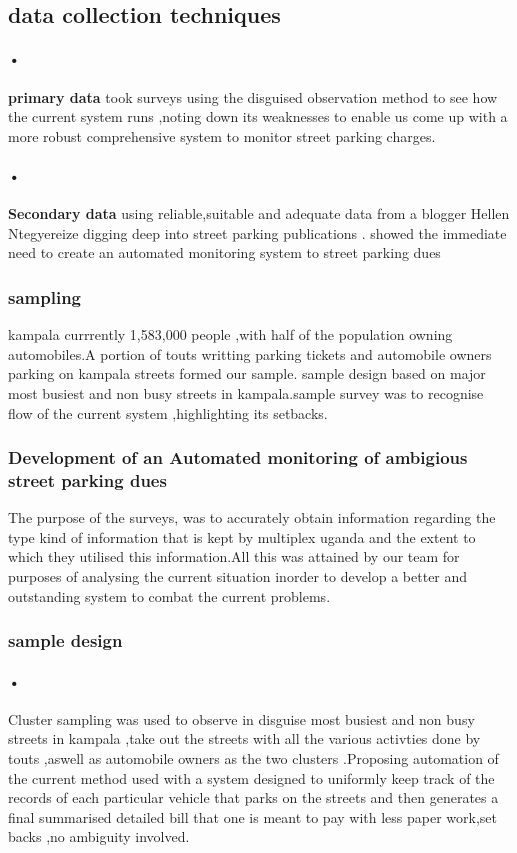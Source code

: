 \documentclass[12pt]{article}
\begin{document}
 \subsection{ data collection techniques }
\paragraph{•}\textbf{ primary data} took surveys using the disguised observation method to see how the current system runs ,noting down its weaknesses to enable us come up with a more robust comprehensive system to monitor street parking charges.\\
   
 \paragraph{•}\textbf{ Secondary data} using reliable,suitable and adequate data from a blogger Hellen Ntegyereize  digging deep into street parking publications . showed the immediate need to create an automated monitoring system to street parking dues\\
\subsubsection{ sampling }
 kampala currrently 1,583,000 people ,with half of the population owning automobiles.A portion of touts writting parking tickets  and automobile owners  parking on kampala streets formed our sample. sample design based on major most busiest and non busy streets in kampala.sample survey was to recognise flow of the current system ,highlighting its setbacks.
      
\subsubsection{ Development of an Automated monitoring of ambigious street parking dues}
The purpose of the surveys, was to accurately obtain information regarding the type kind of information that is kept by multiplex uganda and the extent to which they utilised this information.All this was attained by our team for purposes of analysing the current situation inorder to develop a better and outstanding system to combat the current problems.
\subsubsection{ sample design}
 \paragraph{•}Cluster sampling was used to observe in disguise most busiest and non busy streets in kampala ,take out the streets with all the various activties done by touts ,aswell as automobile owners as the two clusters .Proposing automation of the current method used with a system designed to uniformly keep track of the records of each particular vehicle that parks on the streets and then generates a final summarised detailed bill that one is meant to pay with less paper work,set backs ,no ambiguity involved.
\end{document}
